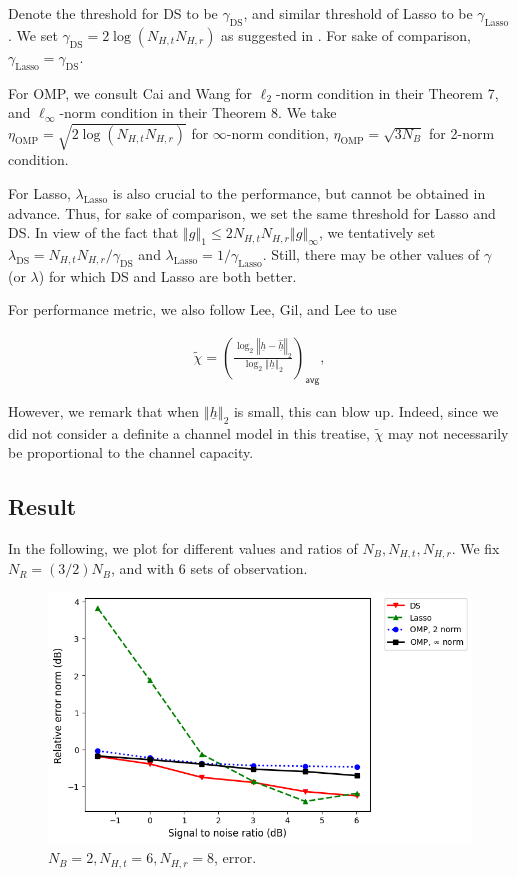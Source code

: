 \documentclass[journal]{IEEEtran}
\newcommand {\g} {\gamma}
\newcommand {\h} {\eta}
\renewcommand {\l} {\lambda}
\newcommand {\m} [1] {\( #1 \)}
\newcommand {\V} [1] {\underline {#1}}
\newcommand {\T} [1] {\tilde {#1}}
\newcommand {\RB} [1] {\left( #1 \right)}
\newcommand {\VNm} [1] {\left \Vert #1 \right \Vert}
\newcommand {\R} [1] {\sqrt {#1}}
\newcommand {\Disp} [1] {
   \begin {align*}
      #1
   \end {align*}
}
\begin{document}
Denote the threshold for DS to be \m {\g_{\mathrm {DS}}}, and similar threshold of Lasso to be \m {\g_{\mathrm {Lasso}}}.
We set \m {\g_{\mathrm {DS}} = 2 \log \RB {N_{H,t} N_{H,r}}} as suggested in \cite {CaT07}.
For sake of comparison, \m {\g_{\mathrm {Lasso}} = \g_{\mathrm {DS}}}.

For OMP, we consult Cai and Wang \cite {CaW11} for \m {\ell _2}-norm condition in their Theorem 7, and \m {\ell _\infty}-norm condition in their Theorem 8.
We take \m {\h_{\mathrm {OMP}} = \R {2 \log \RB {N_{H,t} N_{H,r}}}} for \m {\infty}-norm condition, \m {\h_{\mathrm {OMP}} = \R {3 N_B}} for 2-norm condition.

For Lasso, \m {\l _{\mathrm {Lasso}}} is also crucial to the performance, but cannot be obtained in advance.
Thus, for sake of comparison, we set the same threshold for Lasso and DS.
In view of the fact that \m {\VNm {g} _1 \leq 2 N_{H,t} N_{H,r} \VNm {g} _\infty}, we tentatively set \m {\l _{\mathrm {DS}} =  N_{H,t} N_{H,r} / \g _{\mathrm {DS}}} and \m {\l _{\mathrm {Lasso}} =  1 / \g _{\mathrm {Lasso}}}.
Still, there may be other values of \m {\g} (or \m {\l}) for which DS and Lasso are both better.

For performance metric, we also follow Lee, Gil, and Lee \cite {LGL16} to use
\Disp {
\tilde {\chi}
=\RB {
   \frac {\log_2 {\VNm {\V {h} -\hat {\V {h}}} _2}}
   {\log_2 {\VNm {\V {h}}_2}}
} _{\mathsf {avg}}, 
}
However, we remark that when \m {\VNm {\V {h}}_2} is small, this can blow up.
Indeed, since we did not consider a definite a channel model in this treatise, \m {\T {\chi}} may not necessarily be proportional to the channel capacity.

\subsection {Result}

In the following, we plot for different values and ratios of \m {N_B, N_{H,t}, N_{H,r}}.
We fix \m {N_R = \RB {3/2} N_B}, and with \m {6} sets of observation.

\begin {figure} [H]
\includegraphics [width = 0.45 \textwidth]
{error-small-more-tall-six-usual.png}
\caption {\m {N_B = 2, N_{H,t} = 6, N_{H,r} = 8}, error.}
\end {figure}
\end{document}
